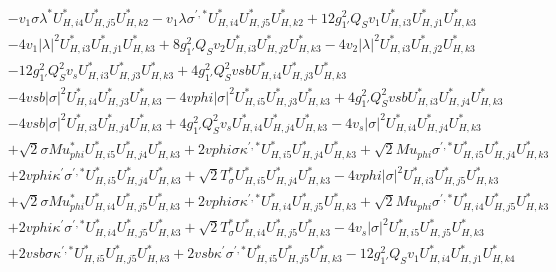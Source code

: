 \begin{align}
 &- v_1 \sigma \lambda^* U^*_{{H},{i 4}} U^*_{{H},{j 5}} U^*_{{H},{k 2}} - v_1 \lambda \sigma^{\prime,*} U^*_{{H},{i 4}} U^*_{{H},{j 5}} U^*_{{H},{k 2}} +12 g_{1'}^{2} Q_{S} v_1 U^*_{{H},{i 3}} U^*_{{H},{j 1}} U^*_{{H},{k 3}} \nonumber \\ 
 &-4 v_1 |\lambda|^2 U^*_{{H},{i 3}} U^*_{{H},{j 1}} U^*_{{H},{k 3}} +8 g_{1'}^{2} Q_{S} v_2 U^*_{{H},{i 3}} U^*_{{H},{j 2}} U^*_{{H},{k 3}} -4 v_2 |\lambda|^2 U^*_{{H},{i 3}} U^*_{{H},{j 2}} U^*_{{H},{k 3}} \nonumber \\ 
 &-12 g_{1'}^{2} Q_{S}^{2} v_s U^*_{{H},{i 3}} U^*_{{H},{j 3}} U^*_{{H},{k 3}} +4 g_{1'}^{2} Q_{S}^{2} vsb U^*_{{H},{i 4}} U^*_{{H},{j 3}} U^*_{{H},{k 3}} \nonumber \\ 
 &-4 vsb |\sigma|^2 U^*_{{H},{i 4}} U^*_{{H},{j 3}} U^*_{{H},{k 3}} -4 vphi |\sigma|^2 U^*_{{H},{i 5}} U^*_{{H},{j 3}} U^*_{{H},{k 3}} +4 g_{1'}^{2} Q_{S}^{2} vsb U^*_{{H},{i 3}} U^*_{{H},{j 4}} U^*_{{H},{k 3}} \nonumber \\ 
 &-4 vsb |\sigma|^2 U^*_{{H},{i 3}} U^*_{{H},{j 4}} U^*_{{H},{k 3}} +4 g_{1'}^{2} Q_{S}^{2} v_s U^*_{{H},{i 4}} U^*_{{H},{j 4}} U^*_{{H},{k 3}} -4 v_s |\sigma|^2 U^*_{{H},{i 4}} U^*_{{H},{j 4}} U^*_{{H},{k 3}} \nonumber \\ 
 &+\sqrt{2} \sigma Mu_{phi}^* U^*_{{H},{i 5}} U^*_{{H},{j 4}} U^*_{{H},{k 3}} +2 vphi \sigma \kappa^{\prime,*} U^*_{{H},{i 5}} U^*_{{H},{j 4}} U^*_{{H},{k 3}} +\sqrt{2} Mu_{phi} \sigma^{\prime,*} U^*_{{H},{i 5}} U^*_{{H},{j 4}} U^*_{{H},{k 3}} \nonumber \\ 
 &+2 vphi \kappa^\prime \sigma^{\prime,*} U^*_{{H},{i 5}} U^*_{{H},{j 4}} U^*_{{H},{k 3}} +\sqrt{2} T_{\sigma}^* U^*_{{H},{i 5}} U^*_{{H},{j 4}} U^*_{{H},{k 3}} -4 vphi |\sigma|^2 U^*_{{H},{i 3}} U^*_{{H},{j 5}} U^*_{{H},{k 3}} \nonumber \\ 
 &+\sqrt{2} \sigma Mu_{phi}^* U^*_{{H},{i 4}} U^*_{{H},{j 5}} U^*_{{H},{k 3}} +2 vphi \sigma \kappa^{\prime,*} U^*_{{H},{i 4}} U^*_{{H},{j 5}} U^*_{{H},{k 3}} +\sqrt{2} Mu_{phi} \sigma^{\prime,*} U^*_{{H},{i 4}} U^*_{{H},{j 5}} U^*_{{H},{k 3}} \nonumber \\ 
 &+2 vphi \kappa^\prime \sigma^{\prime,*} U^*_{{H},{i 4}} U^*_{{H},{j 5}} U^*_{{H},{k 3}} +\sqrt{2} T_{\sigma}^* U^*_{{H},{i 4}} U^*_{{H},{j 5}} U^*_{{H},{k 3}} -4 v_s |\sigma|^2 U^*_{{H},{i 5}} U^*_{{H},{j 5}} U^*_{{H},{k 3}} \nonumber \\ 
 &+2 vsb \sigma \kappa^{\prime,*} U^*_{{H},{i 5}} U^*_{{H},{j 5}} U^*_{{H},{k 3}} +2 vsb \kappa^\prime \sigma^{\prime,*} U^*_{{H},{i 5}} U^*_{{H},{j 5}} U^*_{{H},{k 3}} -12 g_{1'}^{2} Q_{S} v_1 U^*_{{H},{i 4}} U^*_{{H},{j 1}} U^*_{{H},{k 4}} \nonumber \\ 

\end{align}
